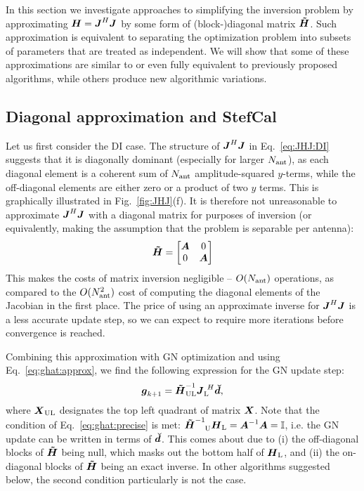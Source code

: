 \documentclass[useAMS,usenatbib]{mn2e}
\makeatletter
\newcommand{\II}{\mathbb{I}}
\newcommand{\vecg}{\bmath{g}}
\newcommand{\mat}[1]{{\bmath{#1}}}
\newcommand{\JJ}{\mat{J}} %
\newcommand{\HH}{\mat{H}} %
\newcommand{\HHa}{\mat{\tilde{H}}} %
\newcommand{\JHJ}{\JJ^H\JJ} %
\newcommand{\Matrix}[2]{\left [ \begin{array}{@{}#1@{}}#2\end{array} \right ]}
\newcommand{\AUG}[1]{\bmath{\breve{#1}}}
\newcommand{\Dd}{\AUG{d}}
\newcommand{\TOP}{\mathrm{U}}%
\newcommand{\LEFT}{\mathrm{L}}
\newcommand{\UL}{\mathrm{UL}}%
\newcommand{\StefCal}{{\sc StefCal}}
\numberwithin{equation}{section}
\makeatother
\begin{document}
In this section we investigate approaches to simplifying the inversion problem by approximating
$\HH=\JJ^H\JJ$ by some form of (block-)diagonal matrix $\HHa$. Such approximation is equivalent to separating
the optimization problem into subsets of parameters that are treated as independent. We will show 
that some of these approximations are similar to or even fully equivalent to previously proposed 
algorithms, while others produce new algorithmic variations.

\subsection{Diagonal approximation and \StefCal}
\label{sec:DI:stefcal}

Let us first consider the DI case. The structure of $\JJ^H\JJ$ in Eq.~\ref{eq:JHJ:DI} suggests that it is diagonally 
dominant (especially for larger $N_\mathrm{ant}$), as each diagonal element is a coherent sum of $N_\mathrm{ant}$ amplitude-squared $y$-terms, 
while the off-diagonal elements are either zero or a product of two $y$ terms. This is graphically illustrated in 
Fig.~\ref{fig:JHJ}(f). It is therefore not unreasonable 
to approximate $\JHJ$ with a diagonal matrix for purposes of inversion (or equivalently, making the assumption that 
the problem is separable per antenna):
\begin{equation}
\HHa = \Matrix{cc}{\bmath{A}&0\\0&\bmath{A}}
\end{equation}
This makes the costs of matrix inversion negligible -- $O(N_\mathrm{ant})$ operations, as compared to the $O(N_\mathrm{ant}^2)$ cost 
of computing the diagonal elements of the Jacobian in the first place. The price of using an approximate inverse for 
$\JHJ$ is a less accurate update step, so we can expect to require more iterations before convergence is reached.

Combining this approximation with GN optimization and using Eq.~\ref{eq:ghat:approx}, we find the following expression
for the GN update step:
\begin{equation}
\label{eq:stefcal-matrix}
\vecg_{k+1} = \HHa^{-1}_{\UL} \JJ_\LEFT^{~H} \Dd,
\end{equation}
where $\bmath{X}_\UL$ designates the top left quadrant of matrix $\bmath{X}$. Note that the condition of 
Eq.~\ref{eq:ghat:precise} is met: $\HHa^{-1}_{~~~\TOP} \HH_\LEFT=\bmath{A}^{-1}\bmath{A}=\II$, i.e. the
GN update can be written in terms of $\Dd$. This comes about due to
(i) the off-diagonal blocks of $\HHa$ being null, which masks out the bottom half of $\HH_\LEFT$, and 
(ii) the on-diagonal blocks of $\HHa$ being an exact inverse. In other algorithms suggested below, the second
condition particularly is not the case.
\end{document}
